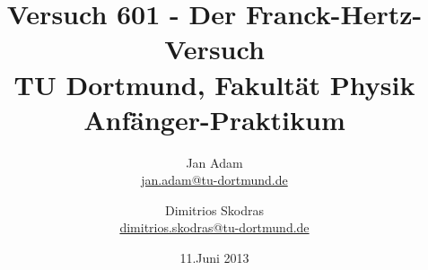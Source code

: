 



\title{Versuch 601 - Der Franck-Hertz-Versuch\\				%
\large TU Dortmund, Fakultät Physik\\ 
\normalsize Anfänger-Praktikum}

\author{Jan Adam\\			%
{\small \href{jan.adam@tu-dortmund.de}{jan.adam@tu-dortmund.de}}	%
\and						%
Dimitrios Skodras\\					%
{\small \href{dimitrios.skodras@tu-dortmund.de}{dimitrios.skodras@tu-dortmund.de}}		%
}
\date{11.Juni 2013}				%





\maketitle					%
\thispagestyle{empty} 				%



\tableofcontents


\newpage					%


